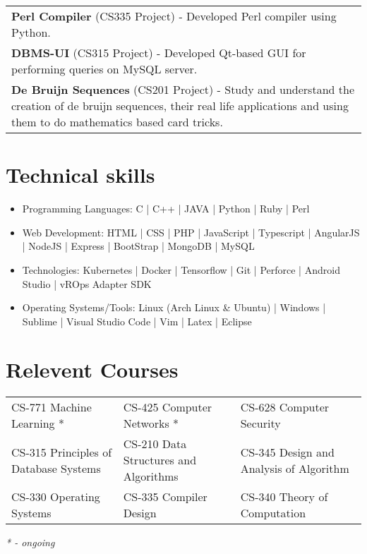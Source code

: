 \documentclass{article}
\begin{document}
\begin{tabularx}{\textwidth}{X}
	  \textbf{Perl Compiler} (CS335 Project) - Developed Perl compiler using Python.\\
	  \textbf{DBMS-UI} (CS315 Project) - Developed Qt-based GUI for performing queries on MySQL server.\\
      \textbf{De Bruijn Sequences} (CS201 Project) - Study and understand the creation of de bruijn sequences, their real life
applications and using them to do mathematics based card tricks.
\end{tabularx}
\vspace{-4mm}
\section{Technical skills}
\begin{itemize}
	\setlength\itemsep{-0.5em}
    \item  Programming Languages: C | C++ | JAVA | Python | Ruby | Perl
    \item  Web Development: HTML | CSS | PHP | JavaScript | Typescript | AngularJS | NodeJS | Express | BootStrap | MongoDB | MySQL
    \item  Technologies: Kubernetes | Docker | Tensorflow | Git | Perforce | Android Studio | vROps Adapter SDK
    \item  Operating Systems/Tools: Linux (Arch Linux \& Ubuntu) | Windows | Sublime | Visual Studio Code | Vim | Latex | Eclipse
\end{itemize}
\vspace{-2mm}
\section{Relevent Courses}
\centering{}
\begin{tabular}{l|l|l}
CS-771 Machine Learning * & CS-425 Computer Networks * & CS-628 Computer Security \\
CS-315 Principles of Database Systems  & CS-210 Data Structures and Algorithms & CS-345 Design and Analysis of Algorithm\\
CS-330 Operating Systems & CS-335 Compiler Design & CS-340 Theory of Computation\\
\end{tabular}
\begin{flushright}
\textit{* - ongoing}
\end{flushright}
\end{document}
